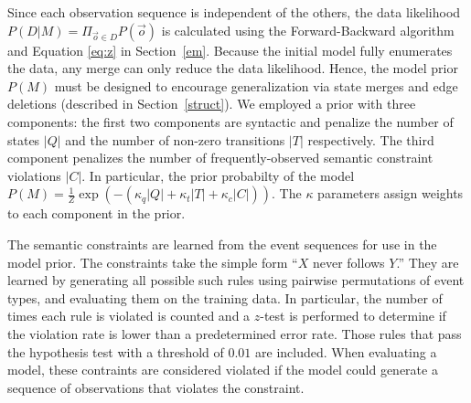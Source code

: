 \documentclass[letterpaper]{article}
\begin{document}
Since each observation sequence is independent of the others,
the data likelihood $P(D|M) = \Pi_{\vec{o} \in D} P(\vec{o})$ is calculated
using the Forward-Backward algorithm and Equation \ref{eq:z} in
Section~\ref{em}. Because the initial model fully enumerates the data, any merge can only reduce the data likelihood. Hence, the model prior $P(M)$ must be designed to encourage generalization via state merges and edge deletions (described in Section~\ref{struct}). We employed a prior with three components: the first two components are syntactic and penalize the number of states $|Q|$ and the number of non-zero transitions $|T|$ respectively. The third component penalizes the number of frequently-observed semantic constraint violations $|C|$. In particular, the prior probabilty of the model  $P(M) = \frac{1}{Z}\exp( -(\kappa_q |Q| + \kappa_t |T| +\kappa_c |C|))$.
The $\kappa$ parameters assign weights to each component in the prior.


The semantic constraints are learned from the event sequences for use in the model prior.  The constraints take the simple form ``$X$ never follows $Y$.''  They are learned by generating all possible such rules using
pairwise permutations of event types, and evaluating them on the training data.
In particular, the number of times each rule is violated is counted and a $z$-test is performed to determine if the violation rate is lower than a predetermined error rate. Those rules that pass the hypothesis test with a threshold of $0.01$ are included.  When evaluating a model, these contraints are considered violated if the model could generate a sequence of observations that violates the constraint. %
\end{document}
